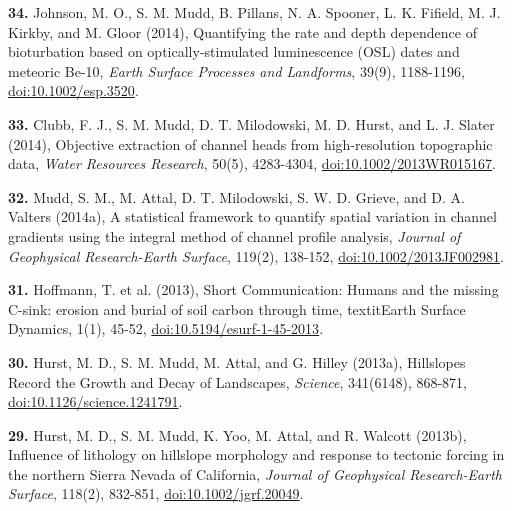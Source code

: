 \documentclass[10pt, a4paper]{article}
\newcommand{\years}[1]{\marginnote{\scriptsize #1}}
\begin{document}
\years{2014}\hangindent=0.7cm\textbf{34.} Johnson, M. O., S. M. Mudd, B. Pillans, N. A. Spooner, L. K. Fifield, M. J. Kirkby, and M. Gloor (2014), Quantifying the rate and depth dependence of bioturbation based on optically-stimulated luminescence (OSL) dates and meteoric Be-10, \textit{Earth Surface Processes and Landforms}, 39(9), 1188-1196, \href{http://dx.doi.org/doi:10.1002/esp.3520}{doi:10.1002/esp.3520}.\par
\hangindent=0.7cm\textbf{33.} Clubb, F. J., S. M. Mudd, D. T. Milodowski, M. D. Hurst, and L. J. Slater (2014), Objective extraction of channel heads from high-resolution topographic data, \textit{Water Resources Research}, 50(5), 4283-4304, \href{http://dx.doi.org/doi:10.1002/2013WR015167}{doi:10.1002/2013WR015167}.\par
{}\par
{}\par 
\hangindent=0.7cm\textbf{32.} Mudd, S. M., M. Attal, D. T. Milodowski, S. W. D. Grieve, and D. A. Valters (2014a), A statistical framework to quantify spatial variation in channel gradients using the integral method of channel profile analysis, \textit{Journal of Geophysical Research-Earth Surface}, 119(2), 138-152, \href{http://dx.doi.org/doi:10.1002/2013JF002981}{doi:10.1002/2013JF002981}.\par

\years{2013}\hangindent=0.7cm\textbf{31.} Hoffmann, T. et al. (2013), Short Communication: Humans and the missing C-sink: erosion and burial of soil carbon through time, textit{Earth Surface Dynamics}, 1(1), 45-52, \href{http://dx.doi.org/doi:10.5194/esurf-1-45-2013}{doi:10.5194/esurf-1-45-2013}.\par
\hangindent=0.7cm\textbf{30.} Hurst, M. D., S. M. Mudd, M. Attal, and G. Hilley (2013a), Hillslopes Record the Growth and Decay of Landscapes, \textit{Science}, 341(6148), 868-871, \href{http://dx.doi.org/doi:10.1126/science.1241791}{doi:10.1126/science.1241791}.\par
\hangindent=0.7cm\textbf{29.} Hurst, M. D., S. M. Mudd, K. Yoo, M. Attal, and R. Walcott (2013b), Influence of lithology on hillslope morphology and response to tectonic forcing in the northern Sierra Nevada of California, \textit{Journal of Geophysical Research-Earth Surface}, 118(2), 832-851, \href{http://dx.doi.org/doi:10.1002/jgrf.20049}{doi:10.1002/jgrf.20049}.\par
\end{document}
